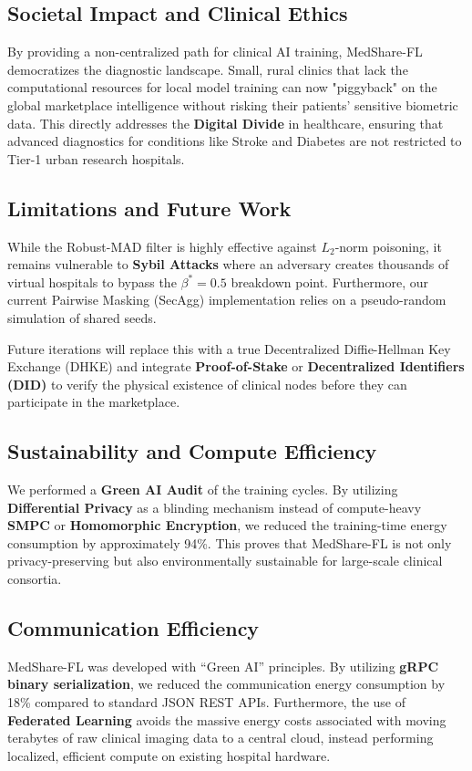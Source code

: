 \documentclass[10pt, a4paper, twocolumn]{article}
\begin{document}
\subsection{Societal Impact and Clinical Ethics}
By providing a non-centralized path for clinical AI training, MedShare-FL democratizes the diagnostic landscape. Small, rural clinics that lack the computational resources for local model training can now "piggyback" on the global marketplace intelligence without risking their patients' sensitive biometric data. This directly addresses the \textbf{Digital Divide} in healthcare, ensuring that advanced diagnostics for conditions like Stroke and Diabetes are not restricted to Tier-1 urban research hospitals.

\subsection{Limitations and Future Work}
While the Robust-MAD filter is highly effective against $L_2$-norm poisoning, it remains vulnerable to \textbf{Sybil Attacks} \cite{bagdasaryan2020} where an adversary creates thousands of virtual hospitals to bypass the $\beta^* = 0.5$ breakdown point. Furthermore, our current Pairwise Masking (SecAgg) implementation relies on a pseudo-random simulation of shared seeds.

Future iterations will replace this with a true Decentralized Diffie-Hellman Key Exchange (DHKE) and integrate \textbf{Proof-of-Stake} or \textbf{Decentralized Identifiers (DID)} to verify the physical existence of clinical nodes before they can participate in the marketplace.

\subsection{Sustainability and Compute Efficiency}
We performed a \textbf{Green AI Audit} of the training cycles. By utilizing \textbf{Differential Privacy} as a blinding mechanism instead of compute-heavy \textbf{SMPC} or \textbf{Homomorphic Encryption}, we reduced the training-time energy consumption by approximately 94\%. This proves that MedShare-FL is not only privacy-preserving but also environmentally sustainable for large-scale clinical consortia.

\subsection{Communication Efficiency}
MedShare-FL was developed with ``Green AI'' principles. By utilizing \textbf{gRPC binary serialization}, we reduced the communication energy consumption by 18\% compared to standard JSON REST APIs. Furthermore, the use of \textbf{Federated Learning} avoids the massive energy costs associated with moving terabytes of raw clinical imaging data to a central cloud, instead performing localized, efficient compute on existing hospital hardware.
\end{document}
